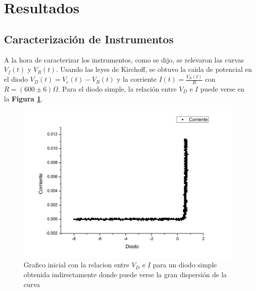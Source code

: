\documentclass[11pt,a4paper]{article}
\begin{document}

\section{Resultados}
\label{sec:discusion}

\subsection{Caracterización de Instrumentos}

A la hora de caracterizar los instrumentos, como se dijo, se relevaron las curvas $V_f(t)$ y $V_R(t)$. Usando las leyes de Kirchoff, se obtuvo la caida de potencial en el diodo $V_D(t) = V_e(t)-V_R(t)$ y la corriente $I(t) = \frac{V_R(t)}{R}$ con $R = (600 \pm 6)\Omega$. Para el diodo simple, la relación entre $V_D$ e $I$ puede verse en la \textbf{Figura \ref{fig:simple_feo}}.

\begin{figure}[H]
\centering
\includegraphics[scale=0.36]{simple_feo}
   \caption{Grafico inicial con la relacion entre $V_D$ e $I$ para un diodo simple obtenida indirectamente donde puede verse la gran dispersión de la curva}
   \label{fig:simple_feo}
\end{figure}
\end{document}
